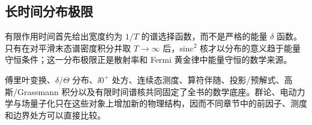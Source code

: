 


\subsection{长时间分布极限}
有限作用时间首先给出宽度约为 $1/T$ 的谱选择函数，而不是严格的能量 $\delta$ 函数。只有在对平滑末态谱密度积分并取 $T\to\infty$ 后，$\mathrm{sinc}^2$ 核才以分布的意义趋于能量守恒条件；这一分布极限正是散射率和 Fermi 黄金律中能量守恒的数学来源。



傅里叶变换、$\delta/\Theta$ 分布、$\ii0^+$ 处方、连续态测度、算符伴随、投影/预解式、高斯/Grassmann 积分以及有限时间谱核共同固定了全书的数学底座。群论、电动力学与场量子化只在这些对象上增加新的物理结构，因而不同章节中的前因子、测度和边界处方可以直接比较。




